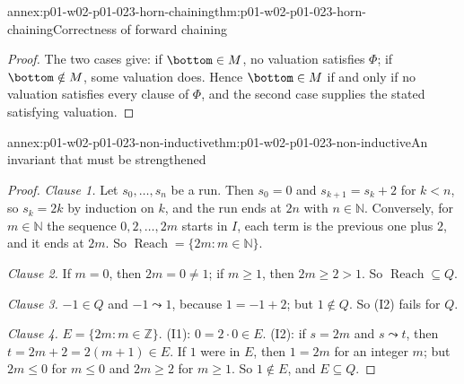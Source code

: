 \begin{annexitem}{annex:p01-w02-p01-023-horn-chaining}{thm:p01-w02-p01-023-horn-chaining}{Correctness of forward chaining}
\begin{proof}
The two cases give: if \(\bottom\in M\), no valuation satisfies \(\Phi\);
if \(\bottom\notin M\), some valuation does. Hence \(\bottom\in M\) if and
only if no valuation satisfies every clause of \(\Phi\), and the second case
supplies the stated satisfying valuation.
\end{proof}
\end{annexitem}

\begin{annexitem}{annex:p01-w02-p01-023-non-inductive}{thm:p01-w02-p01-023-non-inductive}{An invariant that must be strengthened}
\begin{proof}
\emph{Clause 1.} Let \(s_0,\ldots,s_n\) be a run. Then \(s_0=0\) and
\(s_{k+1}=s_k+2\) for \(k<n\), so \(s_k=2k\) by induction on \(k\), and the
run ends at \(2n\) with \(n\in\mathbb N\). Conversely, for \(m\in\mathbb N\)
the sequence \(0,2,\ldots,2m\) starts in \(I\), each term is the previous
one plus \(2\), and it ends at \(2m\). So
\(\operatorname{Reach}=\{2m:m\in\mathbb N\}\).

\emph{Clause 2.} If \(m=0\), then \(2m=0\neq1\); if \(m\geq1\), then
\(2m\geq2>1\). So \(\operatorname{Reach}\subseteq Q\).

\emph{Clause 3.} \(-1\in Q\) and \(-1\leadsto1\), because \(1=-1+2\); but
\(1\notin Q\). So (I2) fails for \(Q\).

\emph{Clause 4.} \(E=\{2m:m\in\mathbb Z\}\). (I1): \(0=2\cdot0\in E\).
(I2): if \(s=2m\) and \(s\leadsto t\), then \(t=2m+2=2(m+1)\in E\). If
\(1\) were in \(E\), then \(1=2m\) for an integer \(m\); but \(2m\leq0\)
for \(m\leq0\) and \(2m\geq2\) for \(m\geq1\). So \(1\notin E\), and
\(E\subseteq Q\).
\end{proof}
\end{annexitem}

